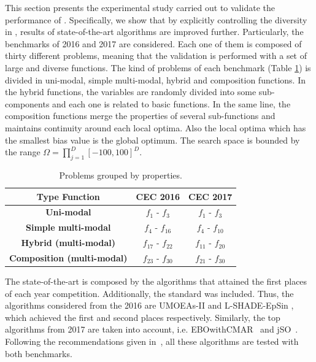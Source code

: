This section presents the experimental study carried out to validate the performance of \DEEDM{}.
%
Specifically, we show that by explicitly controlling the diversity in \DE{}, results of state-of-the-art algorithms
are improved further.
%
Particularly, the benchmarks of \CEC{} 2016 and \CEC{} 2017 are considered.
%
Each one of them is composed of thirty different problems, meaning that the validation is performed with a set of large and diverse
functions.
%
The kind of problems of each benchmark (Table \ref{tab:category}) is divided in uni-modal, simple multi-modal, hybrid and composition functions.
%
%
In the hybrid functions, the variables are randomly divided into some sub-components and each one is related to basic functions.
%
In the same line, the composition functions merge the properties of several sub-functions and maintains continuity around each local optima.
%
Also the local optima which has the smallest bias value is the global optimum.
%
The search space is bounded by the range $\Omega = \prod_{j=1}^D[-100, 100]^D$.

\begin{table}[t]
\centering
\begin{tabular}{|c|c|c|}
\hline
\textbf{Type Function} & \textbf{CEC 2016} & \textbf{CEC 2017} \\ \hline
\textbf{Uni-modal} & $f_1$ - $f_3$ & $f_1$ - $f_3$ \\ \hline
\textbf{Simple multi-modal} & $f_4$ - $f_{16}$ & $f_4$ - $f_{10}$ \\ \hline
\textbf{Hybrid (multi-modal)} & $f_{17}$ - $f_{22}$ & $f_{11}$ - $f_{20}$ \\ \hline
\textbf{Composition (multi-modal)} & $f_{23}$ - $f_{30}$ & $f_{21}$ - $f_{30}$ \\ \hline
\end{tabular}
\caption{Problems grouped by properties.}\label{tab:category}
\end{table}
%
The state-of-the-art is composed by the algorithms that attained the first places of each year competition.
%
Additionally, the standard \DE{} was included.
%
Thus, the algorithms considered from the \CEC{} 2016 are UMOEAs-II \cite{elsayed2016testing} and L-SHADE-EpSin \cite{awad2016ensemble}, which achieved 
the first and second places respectively.
%
Similarly, the top algorithms from \CEC{} 2017 are taken into account, i.e. EBOwithCMAR~\cite{kumar2017improving} and jSO~\cite{brest2017single}.
%
%
%
Following the recommendations given in~\cite{molina2017analysis}, all these algorithms are tested with both benchmarks.


